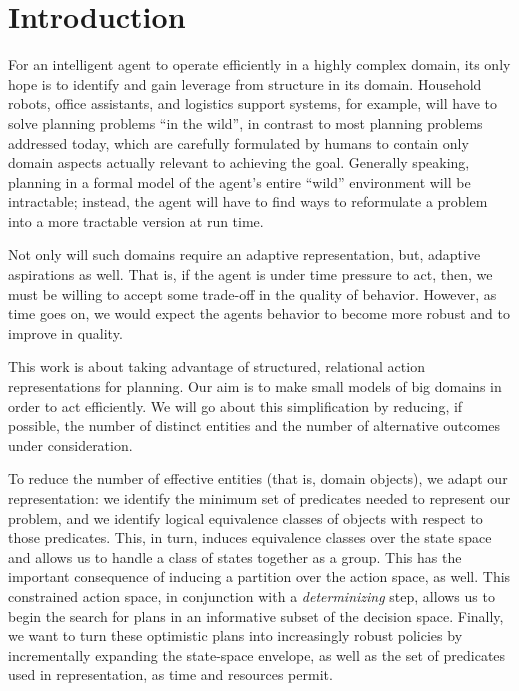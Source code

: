 \section{Introduction}
\label{Introduction}

For an intelligent agent to operate efficiently in a highly complex
domain, its only hope is to identify and gain leverage from structure
in its domain.  Household robots, office assistants, and logistics
support systems, for example, will have to solve planning problems
``in the wild'', in contrast to most planning problems addressed
today, which are carefully formulated by humans to contain only domain
aspects actually relevant to achieving the goal.  Generally speaking,
planning in a formal model of the agent's entire ``wild'' environment
will be intractable; instead, the agent will have to find ways to
reformulate a problem into a more tractable version at run time.

Not only will such domains require an adaptive representation, but,
adaptive aspirations as well. That is, if the agent is under time
pressure to act, then, we must be willing to accept some trade-off in
the quality of behavior. However, as time goes on, we would expect the
agents behavior to become more robust and to improve in quality.



This work is about taking advantage of structured, relational action
representations for planning. Our aim is to make small models of big
domains in order to act efficiently. We will go about this
simplification by reducing, if possible, the number of distinct
entities and the number of alternative outcomes under consideration.


To reduce the number of effective entities (that is, domain objects),
we adapt our representation: we identify the minimum set of predicates needed to represent our problem, and we identify logical equivalence classes
of objects with respect to those predicates. This, in turn, induces equivalence classes over the state space and
allows us to handle a class of states together as a group. This has
the important consequence of inducing a partition over the action
space, as well.  This constrained action space, in conjunction with a
\emph{determinizing} step, allows us to begin the search for plans in
an informative subset of the decision space. Finally, we want to turn
these optimistic plans into increasingly robust policies by
incrementally expanding the state-space envelope, as well as the set of predicates used in representation,
 as time and resources
permit.

